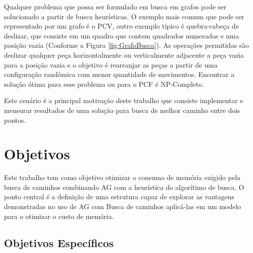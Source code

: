 Qualquer problema que possa ser formulado em busca em grafos pode ser solucionado a partir de busca heurísticas. O exemplo mais comum que pode ser representado por um grafo é o PCV, outro exemplo típico é quebra-cabeça de deslizar, que consiste em um quadro que contem quadrados numerados e uma posição vazia (Conforme a Figura \ref{fig:GrafoBusca}). As operações permitidas são deslizar qualquer peça horizontalmente ou verticalmente adjacente a peça vazia para a posição vazia e o objetivo é rearranjar as peças a partir de uma configuração randômica com menor quantidade de movimentos. Encontrar a solução ótima para esse problema ou para o PCF é NP-Completo. \cite{Kar72} \cite{RatnerW86}

\begin{minipage}{\linewidth}
    \label{fig:slide-puzzle}
\end{minipage}

Este cenário é a principal motivação deste trabalho que consiste implementar e mensurar resultados de uma solução para busca de melhor caminho entre dois pontos.

\section{Objetivos}

Este trabalho tem como objetivo otimizar o consumo de memória exigido pela busca de caminhos combinando AG com a heurística do algorítimo de busca. O ponto central é a definição de uma estrutura capaz de explorar as vantagens demonstradas no uso de AG com Busca de caminhos \cite{Burchardt}\cite{UlyssesTCC} aplicá-las em um modelo para o otimizar o custo de memória.

\subsection{Objetivos Específicos}

